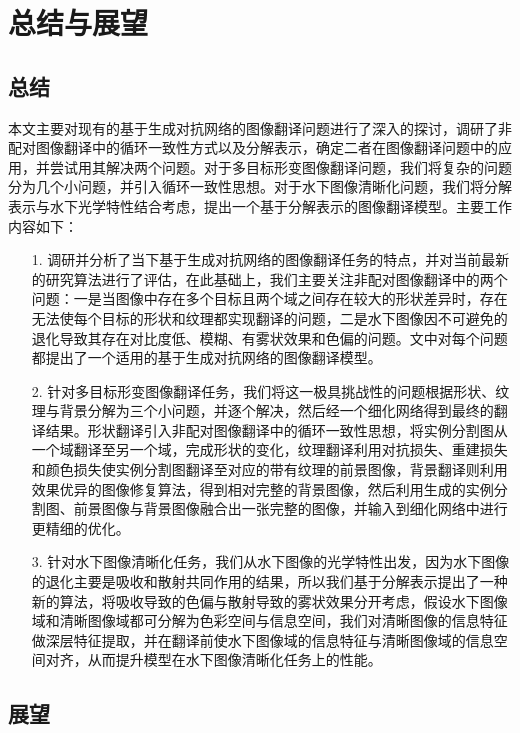 \chapter{总结与展望}

\section{总结}

本文主要对现有的基于生成对抗网络的图像翻译问题进行了深入的探讨，调研了非配对图像翻译中的循环一致性方式以及分解表示，确定二者在图像翻译问题中的应用，并尝试用其解决两个问题。对于多目标形变图像翻译问题，我们将复杂的问题分为几个小问题，并引入循环一致性思想。对于水下图像清晰化问题，我们将分解表示与水下光学特性结合考虑，提出一个基于分解表示的图像翻译模型。主要工作内容如下：

\begin{itemize}
	\item [1.]
	调研并分析了当下基于生成对抗网络的图像翻译任务的特点，并对当前最新的研究算法进行了评估，在此基础上，我们主要关注非配对图像翻译中的两个问题：一是当图像中存在多个目标且两个域之间存在较大的形状差异时，存在无法使每个目标的形状和纹理都实现翻译的问题，二是水下图像因不可避免的退化导致其存在对比度低、模糊、有雾状效果和色偏的问题。文中对每个问题都提出了一个适用的基于生成对抗网络的图像翻译模型。

	\item [2.]
	针对多目标形变图像翻译任务，我们将这一极具挑战性的问题根据形状、纹理与背景分解为三个小问题，并逐个解决，然后经一个细化网络得到最终的翻译结果。形状翻译引入非配对图像翻译中的循环一致性思想，将实例分割图从一个域翻译至另一个域，完成形状的变化，纹理翻译利用对抗损失、重建损失和颜色损失使实例分割图翻译至对应的带有纹理的前景图像，背景翻译则利用效果优异的图像修复算法，得到相对完整的背景图像，然后利用生成的实例分割图、前景图像与背景图像融合出一张完整的图像，并输入到细化网络中进行更精细的优化。

	\item [3.]
	针对水下图像清晰化任务，我们从水下图像的光学特性出发，因为水下图像的退化主要是吸收和散射共同作用的结果，所以我们基于分解表示提出了一种新的算法，将吸收导致的色偏与散射导致的雾状效果分开考虑，假设水下图像域和清晰图像域都可分解为色彩空间与信息空间，我们对清晰图像的信息特征做深层特征提取，并在翻译前使水下图像域的信息特征与清晰图像域的信息空间对齐，从而提升模型在水下图像清晰化任务上的性能。

\end{itemize}

\section{展望}

